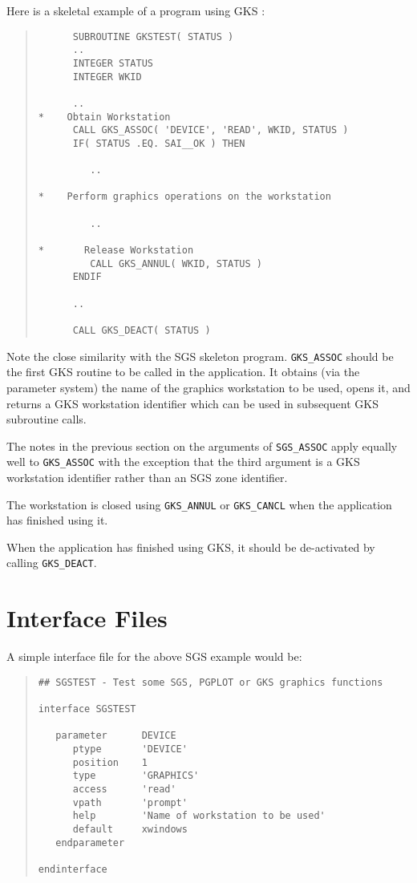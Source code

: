 Here is a skeletal example of a program using GKS :
\begin{quote}
\begin{verbatim}
      SUBROUTINE GKSTEST( STATUS )
      ..
      INTEGER STATUS
      INTEGER WKID

      ..
*    Obtain Workstation
      CALL GKS_ASSOC( 'DEVICE', 'READ', WKID, STATUS )
      IF( STATUS .EQ. SAI__OK ) THEN

         ..

*    Perform graphics operations on the workstation

         ..

*       Release Workstation
         CALL GKS_ANNUL( WKID, STATUS )
      ENDIF

      ..

      CALL GKS_DEACT( STATUS )
\end{verbatim}
\end{quote}

Note the close similarity with the SGS skeleton program. {\tt GKS\_ASSOC}
 should be
the first GKS routine to be called in the application. It obtains (via the
parameter system) the name of the graphics workstation to be used, opens it,
and returns a GKS workstation identifier which can be used in subsequent GKS
subroutine calls.

The notes in the previous section on the arguments of {\tt SGS\_ASSOC}
 apply equally
well to {\tt GKS\_ASSOC} with the exception that the third argument is a GKS
workstation identifier rather than an SGS zone identifier.

The workstation is closed using {\tt GKS\_ANNUL} or {\tt GKS\_CANCL}
when the application has finished using it.

When the application has finished using GKS, it should be de-activated by
calling {\tt GKS\_DEACT}.

\section{Interface Files}
\label{ifl}
A simple interface file for the above SGS example would be:
\begin{quote}
\begin{verbatim}
## SGSTEST - Test some SGS, PGPLOT or GKS graphics functions

interface SGSTEST

   parameter      DEVICE
      ptype       'DEVICE'
      position    1
      type        'GRAPHICS'
      access      'read'
      vpath       'prompt'
      help        'Name of workstation to be used'
      default     xwindows
   endparameter

endinterface
\end{verbatim}
\end{quote}

